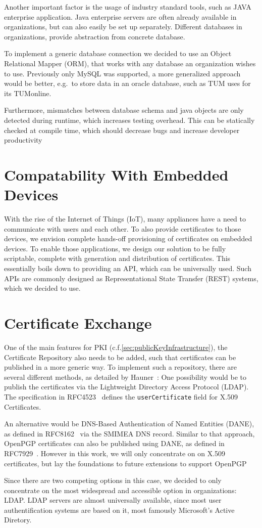 Another important factor is the usage of industry standard tools, such as JAVA enterprise application.
Java enterprise servers are often already available in organizations, but can also easily be set up separately.
Different databases in organizations, provide abstraction from concrete database.

To implement a generic database connection we decided to use an Object Relational Mapper (ORM), that works with any
database an organization wishes to use.
Previously only MySQL was supported, a more generalized approach would be better, e.g.\ to store data in an oracle
database, such as TUM uses for its TUMonline.

Furthermore, mismatches between database schema and java objects are only detected during runtime, which increases
testing overhead.
This can be statically checked at compile time, which should decrease bugs and increase developer productivity

\section{Compatability With Embedded Devices}\label{sec:compatabilityWithEmbeddedDevices}
With the rise of the Internet of Things (IoT), many appliances have a need to communicate with users and each other.
To also provide certificates to those devices, we envision complete hands-off provisioning of certificates on embedded
devices.
To enable those applications, we design our solution to be fully scriptable, complete with generation and distribution
of certificates.
This essentially boils down to providing an API, which can be universally used.
Such APIs are commonly designed as Representational State Transfer (REST) systems, which we decided to use.

\section{Certificate Exchange}\label{sec:certificateExchange}
One of the main features for PKI (c.f.\~\ref{sec:publicKeyInfrastructure}), the Certificate Repository also needs to be
added, such that certificates can be published in a more generic way.
To implement such a repository, there are several different methods, as detailed by
Hauner~\cite{hauner2016interoperability}:
One possibility would be to publish the certificates via the Lightweight Directory Access Protocol (LDAP).
The specification in RFC4523~\cite{RFC4523} defines the \lstinline{userCertificate} field for X.509 Certificates.

An alternative would be DNS-Based Authentication of Named Entities (DANE), as defined in RFC8162~\cite{RFC8162} via the
SMIMEA DNS record.
Similar to that approach, OpenPGP certificates can also be published using DANE, as defined in RFC7929~\cite{RFC7929}.
However in this work, we will only concentrate on on X.509 certificates, but lay the foundations to future extensions
to support OpenPGP

Since there are two competing options in this case, we decided to only concentrate on the most widespread and accessible
option in organizations: LDAP\@.
LDAP servers are almost universally available, since most user authentification systems are based on it, most famously
Microsoft's Active Diretory.
